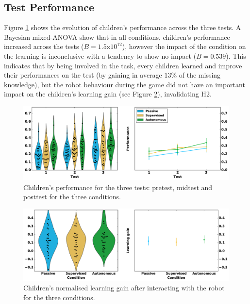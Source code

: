 \subsection{Test Performance}

Figure \ref{fig:tutoring_performance} shows the evolution of children's performance across the three tests. A Bayesian mixed-ANOVA show that in all conditions, children's performance increased across the tests ($B=1.5$x$10^{12}$), however the impact of the condition on the learning is inconclusive with a tendency to show no impact ($B=0.539$). This indicates that by being involved in the task, every children learned and improve their performances on the test (by gaining in average 13\% of the missing knowledge), but the robot behaviour during the game did not have an important impact on the children's learning gain (see Figure \ref{fig:tutoring_learning}), invalidating H2.

\begin{figure}[ht]
	\includegraphics[width=1\linewidth]{perf.pdf}
	\centering
	\caption{Children's performance for the three tests: pretest, midtest and posttest for the three conditions.}
	\label{fig:tutoring_performance}
\end{figure}

\begin{figure}[ht]
	\includegraphics[width=1\linewidth]{learning.pdf}
	\centering
	\caption{Children's normalised learning gain after interacting with the robot for the three conditions.}
	\label{fig:tutoring_learning}
\end{figure}

